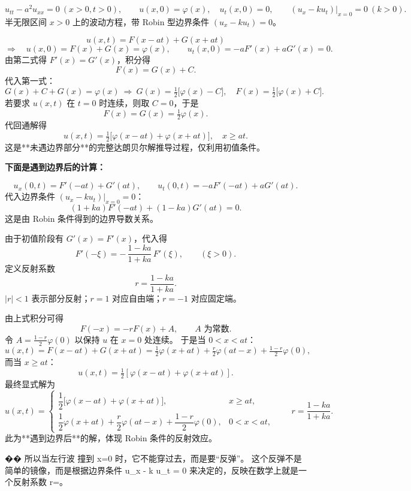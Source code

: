 \begin{solution}

\begin{dxsolution}
\[
u_{tt}-a^2u_{xx}=0\ (x>0,t>0),\qquad
u(x,0)=\varphi(x),\quad u_t(x,0)=0,\qquad
(u_x-ku_t)\big|_{x=0}=0\ (k>0).
\]
\tcblower
半无限区间 $x>0$ 上的波动方程，带 Robin 型边界条件 $(u_x-ku_t)=0$。
\end{dxsolution}

\begin{dxsolution}
\[
u(x,t)=F(x-at)+G(x+at)
\]
\[
\Rightarrow\quad
u(x,0)=F(x)+G(x)=\varphi(x),\qquad
u_t(x,0)=-aF'(x)+aG'(x)=0.
\]
由第二式得 $F'(x)=G'(x)$，积分得
\[
F(x)=G(x)+C.
\]
代入第一式：
\[
G(x)+C+G(x)=\varphi(x)\ \Rightarrow\ 
G(x)=\tfrac12\bigl[\varphi(x)-C\bigr],\quad 
F(x)=\tfrac12\bigl[\varphi(x)+C\bigr].
\]
若要求 $u(x,t)$ 在 $t=0$ 时连续，则取 $C=0$，于是
\[
F(x)=G(x)=\tfrac12\varphi(x).
\]
代回通解得
\[
\boxed{u(x,t)=\tfrac12\bigl[\varphi(x-at)+\varphi(x+at)\bigr]},\quad x\ge at.
\]
\tcblower
这是**未遇边界部分**的完整达朗贝尔解推导过程，仅利用初值条件。
\end{dxsolution}

\medskip
\noindent\textbf{下面是遇到边界后的计算：}

\begin{dxsolution}
\[
u_x(0,t)=F'(-at)+G'(at),\qquad 
u_t(0,t)=-aF'(-at)+aG'(at).
\]
代入边界条件 $(u_x-ku_t)|_{x=0}=0$：
\[
(1+ka)F'(-at)+(1-ka)G'(at)=0.
\]
\tcblower
这是由 Robin 条件得到的边界导数关系。
\end{dxsolution}

\begin{dxsolution}
由于初值阶段有 $G'(x)=F'(x)$，代入得
\[
F'(-\xi)=-\,\frac{1-ka}{1+ka}\,F'(\xi),\qquad(\xi>0).
\]
定义反射系数
\[
r=\frac{1-ka}{1+ka}.
\]
\tcblower
$|r|<1$ 表示部分反射；$r=1$ 对应自由端；$r=-1$ 对应固定端。
\end{dxsolution}

\begin{dxsolution}
由上式积分可得
\[
F(-x)=-rF(x)+A,\qquad A\text{ 为常数}.
\]
令 $A=\tfrac{1-r}{2}\varphi(0)$ 以保持 $u$ 在 $x=0$ 处连续。
于是当 $0<x<at$：
\[
u(x,t)=F(x-at)+G(x+at)
=\tfrac12\varphi(x+at)
+\tfrac{r}{2}\varphi(at-x)
+\tfrac{1-r}{2}\varphi(0),
\]
而当 $x\ge at$：
\[
u(x,t)=\tfrac12[\varphi(x-at)+\varphi(x+at)].
\]
\tcblower
最终显式解为
\[
\boxed{
u(x,t)=
\begin{cases}
\dfrac{1}{2}\bigl[\varphi(x-at)+\varphi(x+at)\bigr], & x\ge at,\\[10pt]
\dfrac{1}{2}\varphi(x+at)
+\dfrac{r}{2}\varphi(at-x)
+\dfrac{1-r}{2}\varphi(0), & 0<x<at,
\end{cases}
\qquad r=\dfrac{1-ka}{1+ka}.
}
\]
此为**遇到边界后**的解，体现 Robin 条件的反射效应。
\end{dxsolution}

\end{solution}
\begin{dxtips}
    �� 所以当左行波 撞到 x=0 时，它不能穿过去，而是要“反弹”。
这个反弹不是简单的镜像，而是根据边界条件 u_x - k u_t = 0 来决定的，反映在数学上就是一个反射系数 r=。
\end{dxtips}

